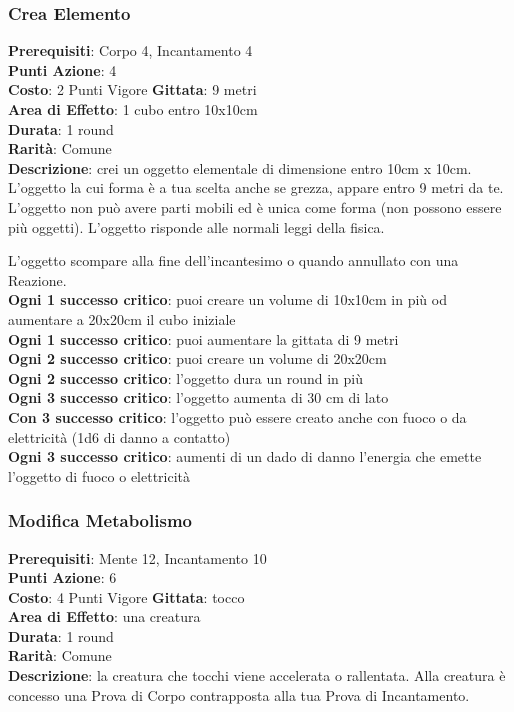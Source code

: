 \documentclass[12pt,a4paper,twoside,openany]{book}
\begin{document}
\begin{multicols}{2}
\subsubsection*{Crea Elemento}
\textbf{Prerequisiti}: Corpo 4, Incantamento 4\\
\textbf{Punti Azione}: 4\\
\textbf{Costo}: 2 Punti Vigore
\textbf{Gittata}: 9 metri\\
\textbf{Area di Effetto}: 1 cubo entro 10x10cm\\
\textbf{Durata}: 1 round\\
\textbf{Rarità}: Comune\\
\textbf{Descrizione}: crei un oggetto elementale di dimensione entro 10cm x 10cm.
L'oggetto la cui forma è a tua scelta anche se grezza, appare entro 9 metri da te. 
L'oggetto non può avere parti mobili ed è unica come forma (non possono essere più oggetti). L'oggetto risponde alle normali leggi della fisica.

L'oggetto scompare alla fine dell'incantesimo o quando annullato con una Reazione.\\
\textbf{Ogni 1 successo critico}: puoi creare un volume di 10x10cm in più od aumentare a 20x20cm il cubo iniziale\\
\textbf{Ogni 1 successo critico}: puoi aumentare la gittata di 9 metri\\
\textbf{Ogni 2 successo critico}: puoi creare un volume di 20x20cm\\
\textbf{Ogni 2 successo critico}: l'oggetto dura un round in più\\
\textbf{Ogni 3 successo critico}: l'oggetto aumenta di 30 cm di lato\\
\textbf{Con 3 successo critico}: l'oggetto può essere creato anche con fuoco o da elettricità (1d6 di danno a contatto)\\
\textbf{Ogni 3 successo critico}: aumenti di un dado di danno l'energia che emette l'oggetto di fuoco o elettricità

\subsubsection*{Modifica Metabolismo}
\textbf{Prerequisiti}: Mente 12, Incantamento 10\\
\textbf{Punti Azione}: 6\\
\textbf{Costo}: 4 Punti Vigore
\textbf{Gittata}: tocco \\
\textbf{Area di Effetto}: una creatura\\
\textbf{Durata}: 1 round\\
\textbf{Rarità}: Comune\\
\textbf{Descrizione}: la creatura che tocchi viene accelerata o rallentata.
Alla creatura è concesso una Prova di Corpo contrapposta alla tua Prova di Incantamento.


\end{multicols}
\end{document}
